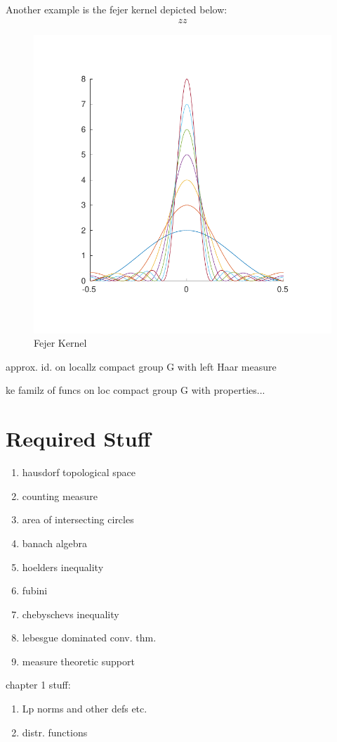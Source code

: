 \begin{example}
Another example is the fejer kernel depicted below:
\begin{align*}
zz
\end{align*}

\begin{figure}[h!bt]
\centering
\includegraphics[width = \textwidth]{matlab/fejerkernel}
\caption{Fejer Kernel}
\label{fejer}
\end{figure}
\end{example}

\begin{theorem}
approx. id. on locallz compact group G with left Haar measure
\end{theorem}

\begin{theorem}
ke familz of funcs on loc compact group G with properties...
\end{theorem}

\section{Required Stuff}

\begin{enumerate}
\item hausdorf topological space
\item counting measure
\item area of intersecting circles
\item banach algebra
\item hoelders inequality
\item fubini
\item chebyschevs inequality
\item lebesgue dominated conv. thm.
\item measure theoretic support
\end{enumerate}

chapter 1 stuff:
\begin{enumerate}
\item Lp norms and other defs etc.
\item distr. functions
\end{enumerate}

